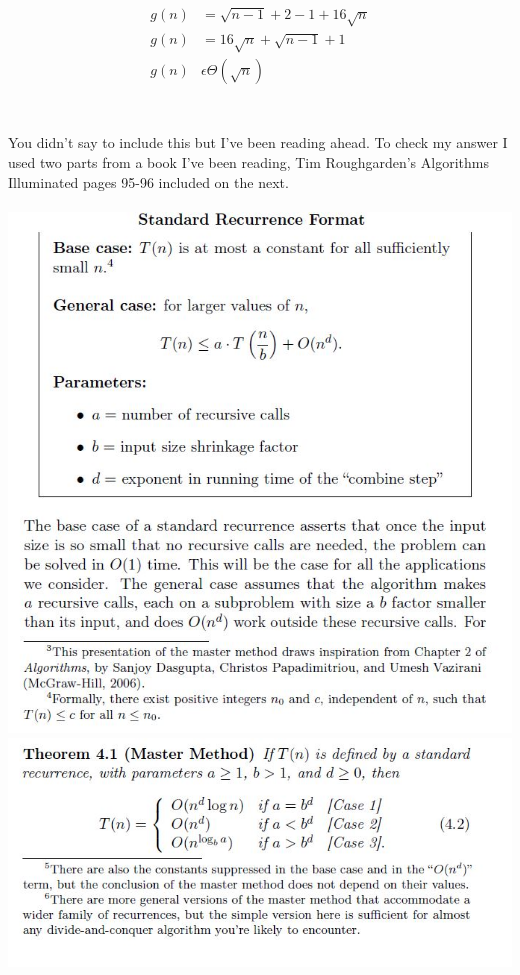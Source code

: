 \documentclass[paper=a4,fontsize=11pt]{article}
\begin{document}
\begin{enumerate}
\begin{enumerate}
\begin{align*}
g(n) &= \sqrt{n - 1} + 2 - 1 + 16\sqrt{n}\\
g(n) &= 16\sqrt{n} + \sqrt{n - 1} + 1\\
g(n) &\epsilon \Theta(\sqrt{n})\\
\end{align*}\\\\
You didn't say to include this but I've been reading ahead. To check my answer I used two parts from a book I've been reading, Tim Roughgarden's Algorithms Illuminated pages 95-96 included on the next.\\\\
\includegraphics[scale = 0.5]{SRF}\\
\includegraphics[scale = 0.5]{mm}\\

\end{enumerate}
\end{enumerate}
\end{document}
